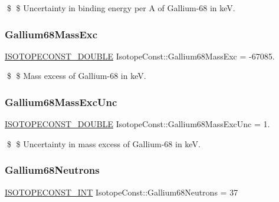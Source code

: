 \$ \$ Uncertainty in binding energy per A of Gallium-\/68 in keV. \mbox{\label{group___isotope_const-_gallium-_ga68_ga710a2261d3479412b2ad376d69c3e24c}} 
\subsubsection{\texorpdfstring{Gallium68\+Mass\+Exc}{Gallium68MassExc}}
{\footnotesize\ttfamily \mbox{\hyperlink{group___isotope_const-_macros_ga8f45a7272ce02c0b4c65c44636ed719a}{I\+S\+O\+T\+O\+P\+E\+C\+O\+N\+S\+T\+\_\+\+D\+O\+U\+B\+LE}} Isotope\+Const\+::\+Gallium68\+Mass\+Exc = -\/67085.}

\$ \$ Mass excess of Gallium-\/68 in keV. \mbox{\label{group___isotope_const-_gallium-_ga68_gae1770ec55310c945aefd56491924cd6d}} 
\subsubsection{\texorpdfstring{Gallium68\+Mass\+Exc\+Unc}{Gallium68MassExcUnc}}
{\footnotesize\ttfamily \mbox{\hyperlink{group___isotope_const-_macros_ga8f45a7272ce02c0b4c65c44636ed719a}{I\+S\+O\+T\+O\+P\+E\+C\+O\+N\+S\+T\+\_\+\+D\+O\+U\+B\+LE}} Isotope\+Const\+::\+Gallium68\+Mass\+Exc\+Unc = 1.}

\$ \$ Uncertainty in mass excess of Gallium-\/68 in keV. \mbox{\label{group___isotope_const-_gallium-_ga68_ga52c20649410d578b6004e890aedbca14}} 
\subsubsection{\texorpdfstring{Gallium68\+Neutrons}{Gallium68Neutrons}}
{\footnotesize\ttfamily \mbox{\hyperlink{group___isotope_const-_macros_ga5f18360b3e99483a35c32d789e62621c}{I\+S\+O\+T\+O\+P\+E\+C\+O\+N\+S\+T\+\_\+\+I\+NT}} Isotope\+Const\+::\+Gallium68\+Neutrons = 37}

